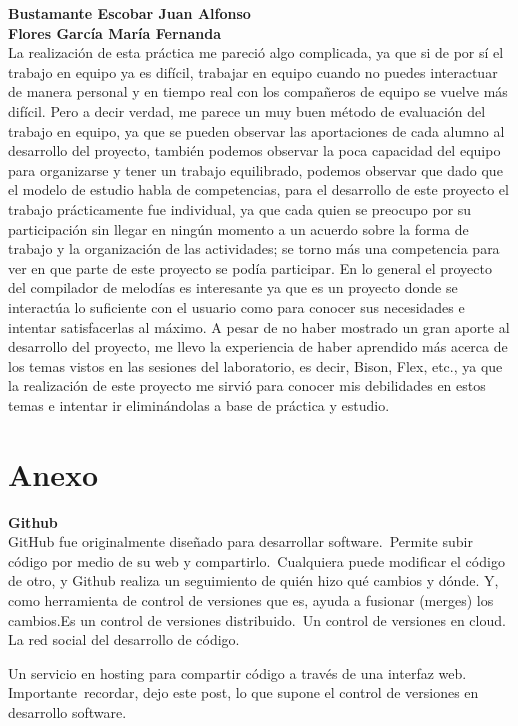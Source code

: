\documentclass[12pt]{article}
\begin{document}
{\bf Bustamante Escobar Juan Alfonso}\\

{\bf Flores García María Fernanda}\\
La realización de esta práctica me pareció algo complicada, ya que si de por sí el trabajo en equipo ya es difícil, trabajar en equipo cuando no puedes interactuar de manera personal y en tiempo real con los compañeros de equipo se vuelve más difícil. Pero a decir verdad, me parece un muy buen método de evaluación del trabajo en equipo, ya que se pueden observar  las aportaciones de cada alumno al desarrollo del proyecto, también podemos observar la poca capacidad del equipo para organizarse y tener un trabajo equilibrado, podemos observar que dado que el modelo de estudio habla de competencias, para el desarrollo de este proyecto el trabajo prácticamente fue individual, ya que cada quien se preocupo por su participación sin llegar en ningún momento a un acuerdo sobre la forma de trabajo y la organización de las actividades; se torno más una competencia para ver en que parte de este proyecto se podía participar.
En lo general el proyecto del compilador de melodías es interesante ya que es un proyecto donde se interactúa lo suficiente con el usuario como para conocer sus necesidades e intentar satisfacerlas al máximo. A pesar de no haber mostrado un gran aporte al desarrollo del proyecto, me llevo la experiencia de haber aprendido más  acerca de los temas vistos en las sesiones del laboratorio, es decir, Bison, Flex, etc., ya que la realización de este proyecto me sirvió para conocer mis debilidades en estos temas e intentar ir eliminándolas a base de práctica y estudio.\\


\section{Anexo}
{\bf Github}\\
GitHub fue originalmente diseñado para desarrollar software. Permite subir código por medio de su web y compartirlo. Cualquiera puede modificar el código de otro, y Github realiza un seguimiento de quién hizo qué cambios y dónde. Y, como herramienta de control de versiones que es, ayuda a fusionar (merges) los cambios.Es un control de versiones distribuido. Un control de versiones en cloud. La red social del desarrollo de código.

Un servicio en hosting para compartir código a través de una interfaz web. Importante recordar, dejo este post, lo que supone el control de versiones en desarrollo software.
\end{document}
